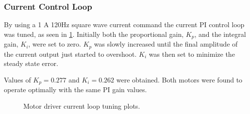 \subsubsection{Current Control Loop}

By using a 1 A 120Hz square wave current command the current PI control loop was tuned, as seen in \cref{fig:current-tuning-plots}. Initially both  the proportional gain, $K_p$, and the integral gain, $K_i$, were set to zero. $K_p$ was slowly increased until the final amplitude of the current output just started to overshoot. $K_i$ was then set to minimize the steady state error. 

Values of $K_p = 0.277$ and $K_i = 0.262$ were obtained. Both motors were found to operate optimally with the same PI gain values.

\begin{figure}
\centering
{}
\caption{Motor driver current loop tuning plots.}
\label{fig:current-tuning-plots}
\end{figure}

